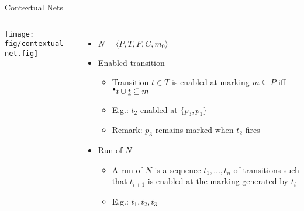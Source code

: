 \documentclass[table,red,11pt]{beamer}
\begin{document}
\begin{frame}[t]{Contextual Nets}
\vspace{1cm}
\begin{columns}[T]

\centerline{\texttt{[image: fig/contextual-net.fig]}}

\begin{itemize}
\item $N = \langle P, T, F, C, m_0 \rangle$

\item<2-> Enabled transition
\begin{itemize}
\item Transition $t \in T$ is \alert{enabled} at marking $m \subseteq P$ iff
${}^\bullet t \cup \underline{t} \subseteq m$
\item E.g.: $t_2$ enabled at $\{p_3, p_1\}$
\item Remark: $p_3$ \alert{remains marked} when $t_2$ fires
\end{itemize}

\item<3-> Run of $N$
\begin{itemize}
\item A \alert{run} of $N$ is a sequence $t_1, \ldots, t_n$ of transitions such
that $t_{i+1}$ is enabled at the marking generated by $t_i$
\item E.g.: $t_1, t_2, t_3$
\end{itemize}
\end{itemize}
\end{columns}
\end{frame}
\end{document}
